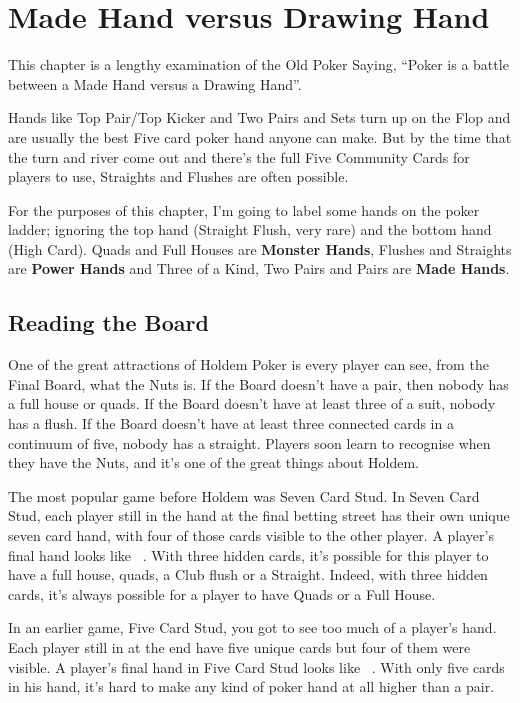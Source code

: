 \chapter{Made Hand versus Drawing Hand}

This chapter is a lengthy examination of the Old Poker Saying, ``Poker
is a battle between a Made Hand versus a Drawing Hand''.

Hands like Top Pair/Top Kicker and Two Pairs and Sets turn up on the
Flop and are usually the best Five card poker hand anyone can
make. But by the time that the turn and river come out and there's the
full Five Community Cards for players to use, Straights and Flushes
are often possible.

For the purposes of this chapter, I'm going to label some hands on the
poker ladder; ignoring the top hand (Straight Flush, very rare) and
the bottom hand (High Card). Quads and Full Houses are \textbf{Monster
Hands}, Flushes and Straights are \textbf{Power Hands} and Three of a
Kind, Two Pairs and Pairs are \textbf{Made Hands}.


\section{Reading the Board}

One of the great attractions of Holdem Poker is every player can see,
from the Final Board, what the Nuts is. If the Board doesn't have a
pair, then nobody has a full house or quads. If the Board doesn't have
at least three of a suit, nobody has a flush. If the Board doesn't
have at least three connected cards in a continuum of five, nobody has
a straight. Players soon learn to recognise when they have the Nuts,
and it's one of the great things about Holdem.

The most popular game before Holdem was Seven Card Stud. In Seven Card
Stud, each player still in the hand at the final betting street has their
own unique seven card hand, with four of those cards visible to the
other player. A player's final hand looks like
\back\back\nines\Qc\Jc\tred\back\ . With three hidden cards, it's possible
for this player to have a full house, quads, a Club flush or a Straight.
Indeed, with three hidden cards, it's always possible for a player to have
Quads or a Full House.

In an earlier game, Five Card Stud, you got to see too much of a
player's hand. Each player still in at the end have five unique cards
but four of them were visible. A player's final hand in Five Card Stud
looks like \back\nines\Qc\Jc\tred\ . With only five cards in his hand,
it's hard to make any kind of poker hand at all higher than a pair.

